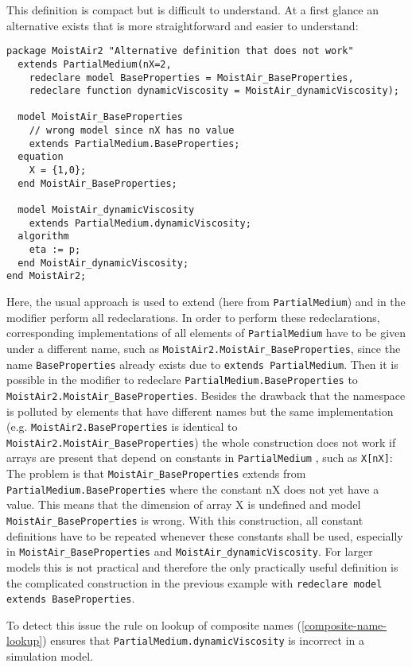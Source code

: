 \begin{nonnormative}
This definition is compact but is difficult to understand. At a
first glance an alternative exists that is more straightforward and
easier to understand:
\begin{lstlisting}[language=modelica]
package MoistAir2 "Alternative definition that does not work"
  extends PartialMedium(nX=2,
    redeclare model BaseProperties = MoistAir_BaseProperties,
    redeclare function dynamicViscosity = MoistAir_dynamicViscosity);

  model MoistAir_BaseProperties
    // wrong model since nX has no value
    extends PartialMedium.BaseProperties;
  equation
    X = {1,0};
  end MoistAir_BaseProperties;

  model MoistAir_dynamicViscosity
    extends PartialMedium.dynamicViscosity;
  algorithm
    eta := p;
  end MoistAir_dynamicViscosity;
end MoistAir2;
\end{lstlisting}

Here, the usual approach is used to extend (here from \lstinline!PartialMedium!) and
in the modifier perform all redeclarations. In order to perform these
redeclarations, corresponding implementations of all elements of \lstinline!PartialMedium!
have to be given under a different name, such as \lstinline!MoistAir2.MoistAir_BaseProperties!, since the name
\lstinline!BaseProperties!
already exists due to \lstinline!extends PartialMedium!. Then it is possible in
the modifier to redeclare \lstinline!PartialMedium.BaseProperties! to
\lstinline!MoistAir2.MoistAir_BaseProperties!. Besides the drawback that the
namespace is polluted by elements that have different names but the same
implementation (e.g. \lstinline!MoistAir2.BaseProperties! is identical to
\lstinline!MoistAir2.MoistAir_BaseProperties!) the whole construction does not work
if arrays are present that depend on constants in \lstinline!PartialMedium! , such as
\lstinline!X[nX]!: The problem is that \lstinline!MoistAir_BaseProperties! extends from
\lstinline!PartialMedium.BaseProperties! where the constant nX does not yet have a value.
This means that the dimension of array X is undefined and model
\lstinline!MoistAir_BaseProperties! is wrong. With this construction, all constant
definitions have to be repeated whenever these constants shall be used,
especially in \lstinline!MoistAir_BaseProperties! and \lstinline!MoistAir_dynamicViscosity!.
For larger models this is not practical and therefore the only
practically useful definition is the complicated construction in the
previous example with \lstinline!redeclare model extends BaseProperties!.

To detect this issue the rule on lookup of composite names (\autoref{composite-name-lookup})
ensures that \lstinline!PartialMedium.dynamicViscosity! is incorrect in a
simulation model.
\end{nonnormative}

